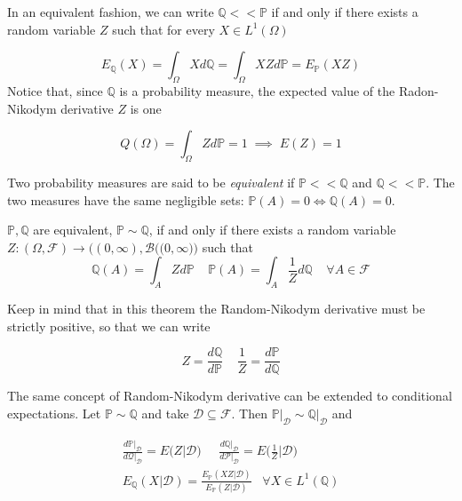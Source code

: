 In an equivalent fashion, we can write $\mathbb{Q} << \mathbb{P}$ if and only if there exists a random variable $Z$ such that for every $X \in L^1(\Omega)$

\begin{equation}
    E_{\mathbb{Q}}(X) = \int_{\Omega} X d\mathbb{Q} = \int_{\Omega} X Z d\mathbb{P} = E_{\mathbb{P}}(XZ) 
\end{equation}
Notice that, since $\mathbb{Q}$ is a probability measure, the expected value of the Radon-Nikodym derivative $Z$ is one

\begin{equation*}
    Q(\Omega) = \int_{\Omega} Z d\mathbb{P} = 1 \; \implies \; E(Z) = 1 
\end{equation*}

Two probability measures are said to be \textit{equivalent} if $\mathbb{P} << \mathbb{Q}$ and $\mathbb{Q} << \mathbb{P}$. The two measures have the same negligible sets: $\mathbb{P}(A) = 0 \iff \mathbb{Q}(A) = 0$. 

\begin{theorem}
    $\mathbb{P},\mathbb{Q}$ are equivalent, $\mathbb{P} \sim \mathbb{Q}$, if and only if there exists a random variable $Z : (\Omega,\mathcal{F}) \to \Big( (0,\infty), \mathcal{B}\big((0,\infty\big)\Big)$ such that 
    \begin{equation*}
        \mathbb{Q}(A) = \int_A Z d\mathbb{P} \;\;\;\; \mathbb{P}(A) = \int_A \frac{1}{Z} d\mathbb{Q} \;\;\;\; \forall A \in \mathcal{F}
    \end{equation*}
\end{theorem}
Keep in mind that in this theorem the Random-Nikodym derivative must be strictly positive, so that we can write

\begin{equation*}
    Z = \frac{d\mathbb{Q}}{d\mathbb{P}} \;\;\;\; \frac{1}{Z} = \frac{d\mathbb{P}}{d\mathbb{Q}}
\end{equation*}

The same concept of Random-Nikodym derivative can be extended to conditional expectations. Let $\mathbb{P} \sim \mathbb{Q}$ and take $\mathcal{D} \subseteq \mathcal{F}$. Then $\mathbb{P} \vert_{\mathcal{D}} \sim \mathbb{Q}\vert_{\mathcal{D}}$ and 

\begin{gather*}
    \frac{d\mathbb{P} \vert_{\mathcal{D}}}{d\mathcal{Q} \vert_{\mathcal{D}}} = E\big( Z \vert \mathcal{D} \big) \;\;\;\;\; \frac{d\mathbb{Q} \vert_{\mathcal{D}}}{d\mathcal{P} \vert_{\mathcal{D}}} = E\Big( \frac{1}{Z} \Big\vert \mathcal{D} \Big) \\
    E_{\mathbb{Q}}(X \vert \mathcal{D}) = \frac{E_{\mathbb{P}}(XZ \vert \mathcal{D})}{E_{\mathbb{P}}(Z\vert \mathcal{D})} \;\;\; \forall X \in L^1 (\mathbb{Q})
\end{gather*}


